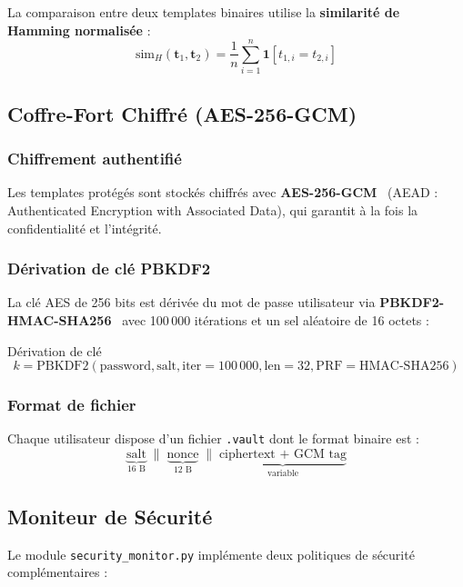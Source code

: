 \documentclass[12pt,a4paper]{article}
\begin{document}
La comparaison entre deux templates binaires utilise la
\textbf{similarité de Hamming normalisée} :
\[
  \text{sim}_H(\mathbf{t}_1, \mathbf{t}_2) = \frac{1}{n} \sum_{i=1}^n
  \mathbf{1}[t_{1,i} = t_{2,i}]
\]

\subsection{Coffre-Fort Chiffré (AES-256-GCM)}

\subsubsection{Chiffrement authentifié}

Les templates protégés sont stockés chiffrés avec
\textbf{AES-256-GCM}~\cite{nist2007} (AEAD : Authenticated Encryption with
Associated Data), qui garantit à la fois la confidentialité et l'intégrité.

\subsubsection{Dérivation de clé PBKDF2}

La clé AES de 256 bits est dérivée du mot de passe utilisateur via
\textbf{PBKDF2-HMAC-SHA256}~\cite{rfc8018} avec 100\,000 itérations et un
sel aléatoire de 16 octets :

\begin{formulebox}{Dérivation de clé}
\[
  k = \text{PBKDF2}(\text{password}, \text{salt}, \text{iter}=100\,000,
  \text{len}=32, \text{PRF}=\text{HMAC-SHA256})
\]
\end{formulebox}

\subsubsection{Format de fichier}

Chaque utilisateur dispose d'un fichier \texttt{.vault} dont le format binaire
est :
\[
  \underbrace{\text{salt}}_{\text{16 B}} \;\|\;
  \underbrace{\text{nonce}}_{\text{12 B}} \;\|\;
  \underbrace{\text{ciphertext + GCM tag}}_{\text{variable}}
\]

\subsection{Moniteur de Sécurité}

Le module \texttt{security\_monitor.py} implémente deux politiques de sécurité
complémentaires :
\end{document}

